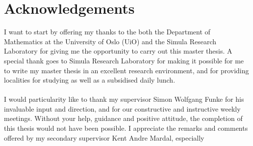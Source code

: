 \chapter*{Acknowledgements}
I want to start by offering my thanks to the both the Department of Mathematics at the University of Oslo (UiO) and the Simula Research Laboratory for giving me the opportunity to carry out this master thesis. A special thank goes to Simula Research Laboratory for making it possible for me to write my master thesis in an excellent research environment, and for providing localities for studying as well as a subsidised daily lunch.
\\
\\
I would particularity like to thank my supervisor Simon Wolfgang Funke for his invaluable input and direction, and for our constructive and instructive weekly meetings. Without your help, guidance and positive attitude, the completion of this thesis would not have been possible. I appreciate the remarks and comments offered by my secondary supervisor Kent Andre Mardal, especially 